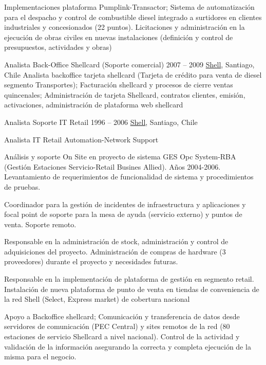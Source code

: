 \begin{joblist}[12.8][8.4][4]
{    \checkmark Implementaciones plataforma Pumplink-Transactor; Sistema de automatización para el despacho y control de combustible diesel integrado a surtidores en clientes industriales y concesionados (22 puntos). Licitaciones y administración en la ejecución de obras civiles en nuevas instalaciones (definición y control de presupuestos, actividades y obras)
  }

\item[Analista Back-Office Shellcard (Soporte comercial)]{2007 -- 2009}
  {
  \href{https://www.shell.com/}{Shell}, Santiago, Chile}
  {
     Analista backoffice tarjeta shellcard (Tarjeta de crédito para venta de diesel segmento Transportes); Facturación shellcard y procesos de cierre ventas quincenales; Administración de tarjeta Shellcard, contratos clientes, emisión, activaciones, administración de plataforma web shellcard
  }

\item[Analista Soporte IT Retail]{1996 -- 2006}
  {
  \href{https://www.shell.com/}{Shell}, Santiago, Chile}
  {
    Analista IT Retail Automation-Network Support

    \checkmark    Análisis y soporte On Site en proyecto de sistema GES Opc System-RBA (Gestión Estaciones Servicio-Retail Busines Allied). Años 2004-2006. Levantamiento de requerimientos de funcionalidad de sistema y procedimientos de pruebas.

    \checkmark    Coordinador para la gestión de incidentes de infraestructura y aplicaciones y focal point de soporte para la mesa de ayuda (servicio externo) y puntos de venta. Soporte remoto.

    \checkmark   Responsable en la administración de stock, administración y control de adquisiciones del proyecto. Administración de compras de hardware (3 proveedores) durante el proyecto y necesidades futuras.

    \checkmark    Responsable en la implementación de plataforma de gestión en segmento retail. Instalación de nueva plataforma de punto de venta en tiendas de conveniencia de la red Shell (Select, Express market) de cobertura nacional

    \checkmark    Apoyo a Backoffice shellcard; Comunicación y transferencia de datos desde servidores de comunicación (PEC Central) y sites remotos de la red (80 estaciones de servicio Shellcard a nivel nacional). Control de la actividad y validación de la información asegurando la correcta y completa ejecución de la misma para el negocio.

}
\end{joblist}
